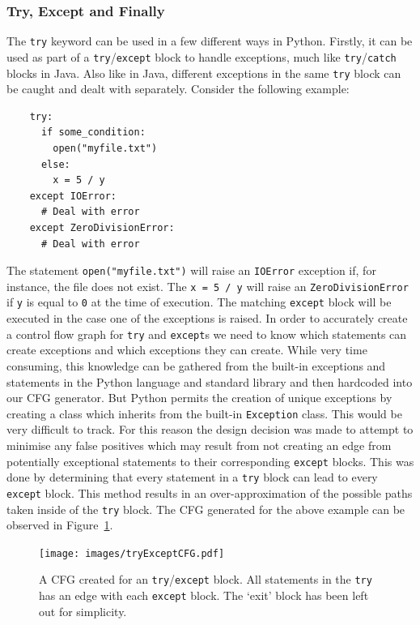 \documentclass[12pt, titlepage]{article}
\begin{document}
\subsubsection{Try, Except and Finally}
The \texttt{try} keyword can be used in a few different ways in Python. Firstly, it can be used as part of a \texttt{try}/\texttt{except} block to handle exceptions, much like \texttt{try}/\texttt{catch} blocks in Java. Also like in Java, different exceptions in the same \texttt{try} block can be caught and dealt with separately. Consider the following example:
\begin{lstlisting}
    try:
      if some_condition:
        open("myfile.txt")
      else:
        x = 5 / y        
    except IOError:
      # Deal with error
    except ZeroDivisionError:
      # Deal with error
\end{lstlisting}
The statement \texttt{open("myfile.txt")} will raise an \texttt{IOError} exception if, for instance, the file does not exist. The \texttt{x = 5 / y} will raise an \texttt{ZeroDivisionError} if \texttt{y} is equal to \texttt{0} at the time of execution. The matching \texttt{except} block will be executed in the case one of the exceptions is raised. In order to accurately create a control flow graph for \texttt{try} and \texttt{except}s we need to know which statements can create exceptions and which exceptions they can create. While very time consuming, this knowledge can be gathered from the built-in exceptions and statements in the Python language and standard library and then hardcoded into our CFG generator. But Python permits the creation of unique exceptions by creating a class which inherits from the built-in \texttt{Exception} class. This would be very difficult to track. For this reason the design decision was made to attempt to minimise any false positives which may result from not creating an edge from potentially exceptional statements to their corresponding \texttt{except} blocks. This was done by determining that every statement in a \texttt{try} block can lead to every \texttt{except} block. This method results in an over-approximation of the possible paths taken inside of the \texttt{try} block. The CFG generated for the above example can be observed in Figure~\ref{fig:tryExceptCFG}. \\

\begin{figure}
    \centering
    \texttt{[image: images/tryExceptCFG.pdf]}
    \caption{A CFG created for an \texttt{try}/\texttt{except} block. All statements in the \texttt{try} has an edge with each \texttt{except} block. The `exit' block has been left out for simplicity.}
    \label{fig:tryExceptCFG}
\end{figure}
\end{document}
